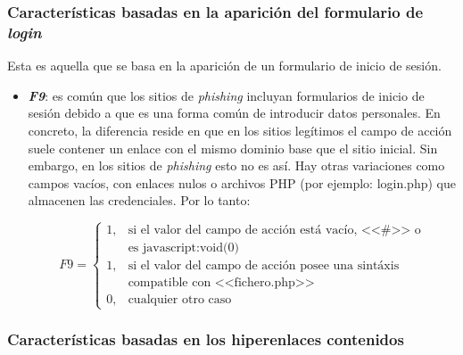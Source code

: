 \subsubsection{Características basadas en la aparición del formulario de \textit{login}}
Esta es aquella que se basa en la aparición de un formulario de inicio de sesión.

\begin{itemize}
	\item \textit{\textbf{F9}}: es común que los sitios de \textit{phishing} incluyan formularios de inicio de sesión debido a que es una forma común de introducir datos personales. En concreto, la diferencia reside en que en los sitios legítimos el campo de acción suele contener un enlace con el mismo dominio base que el sitio inicial. Sin embargo, en los sitios de \textit{phishing} esto no es así. Hay otras variaciones como campos vacíos, con enlaces nulos o archivos PHP (por ejemplo: login.php) que almacenen las credenciales. Por lo tanto:

	\[F9 = \left\{ \begin{array}{lr} 1, & \text{si el valor del campo de acción está vacío, <<\#>> o}\\ & \text{es javascript:void(0)}\\ 
	1, & \text{si el valor del campo de acción posee una sintáxis} \\ &  \text{compatible con <<fichero.php>>} \\
	0, & \text{cualquier otro caso} \label{eqn:phishing_f9} \end{array} \right. \]
\end{itemize}

\subsubsection{Características basadas en los hiperenlaces contenidos}

